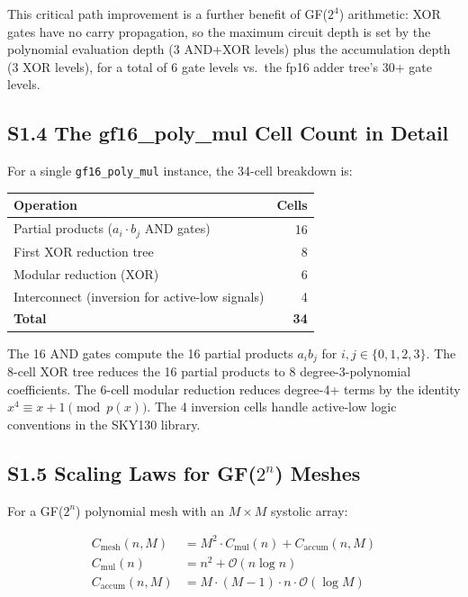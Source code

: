 This critical path improvement is a further benefit of GF(\(2^4\)) arithmetic:
XOR gates have no carry propagation, so the maximum circuit depth is
set by the polynomial evaluation depth (3 AND+XOR levels) plus the
accumulation depth (3 XOR levels), for a total of 6 gate levels vs.\ the
fp16 adder tree's 30+ gate levels.

\subsection{S1.4 The gf16\_poly\_mul Cell Count in Detail}

For a single \texttt{gf16\_poly\_mul} instance, the 34-cell breakdown is:

\begin{center}
\begin{tabular}{lr}
\toprule
\textbf{Operation} & \textbf{Cells} \\
\midrule
Partial products (\(a_i \cdot b_j\) AND gates) & 16 \\
First XOR reduction tree & 8 \\
Modular reduction (XOR) & 6 \\
Interconnect (inversion for active-low signals) & 4 \\
\midrule
\textbf{Total} & \textbf{34} \\
\bottomrule
\end{tabular}
\end{center}

The 16 AND gates compute the 16 partial products \(a_i b_j\) for
\(i, j \in \{0,1,2,3\}\).
The 8-cell XOR tree reduces the 16 partial products to 8 degree-3-polynomial
coefficients.
The 6-cell modular reduction reduces degree-4+ terms by the identity
\(x^4 \equiv x + 1 \pmod{p(x)}\).
The 4 inversion cells handle active-low logic conventions in the SKY130 library.

\subsection{S1.5 Scaling Laws for GF(\(2^n\)) Meshes}

For a GF(\(2^n\)) polynomial mesh with an \(M \times M\) systolic array:

\begin{align}
C_{\mathrm{mesh}}(n, M) &= M^2 \cdot C_{\mathrm{mul}}(n) + C_{\mathrm{accum}}(n, M) \\
C_{\mathrm{mul}}(n) &= n^2 + \mathcal{O}(n \log n) \\
C_{\mathrm{accum}}(n, M) &= M \cdot (M-1) \cdot n \cdot \mathcal{O}(\log M)
\end{align}

